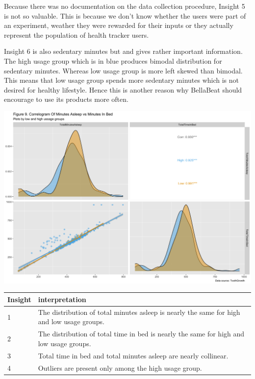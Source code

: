 \documentclass[
]{article}
\begin{document}
Because there was no documentation on the data collection procedure,
Insight 5 is not so valuable. This is because we don't know whether the
users were part of an experiment, weather they were rewarded for their
inputs or they actually represent the population of health tracker
users.

Insight 6 is also sedentary minutes but and gives rather important
information. The high usage group which is in blue produces bimodal
distribution for sedentary minutes. Whereas low usage group is more left
skewed than bimodal. This means that low usage group spends more
sedentary minutes which is not desired for healthy lifestyle. Hence this
is another reason why BellaBeat should encourage to use its products
more often.

\includegraphics[width=0.9\linewidth]{./figs/correlogram4}

\begin{table}
\centering\begingroup\fontsize{14}{16}\selectfont

\begin{tabular}[t]{l|l}
\hline
Insight & interpretation\\
\hline
1 & The distribution of total minutes asleep is nearly the same for high and low usage groups.\\
\hline
2 & The distribution of total time in bed is nearly the same for high and low usage groups.\\
\hline
3 & Total time in bed and total minutes asleep are nearly collinear.\\
\hline
4 & Outliers are present only among the high usage group.\\
\hline
\end{tabular}
\endgroup{}
\end{table}
\end{document}
